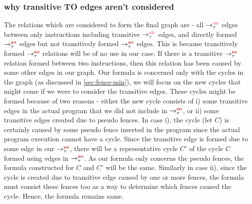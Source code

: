 \subsubsection{why transitive TO edges aren't considered} \label{sec:no-transitive}
The relations which are considered to form the final graph are - 
all $\setSB$ edges between only \mosc instructions including transitive $\setSB$ edges, 
and directly formed $\setSO$ edges but not transitively formed $\setSO$ edges.  
This is because transitively formed $\setSO$ relations will be of 
no use in our case. If there is a transitive $\setSO$ relation formed 
between two instructions, then this relation has been caused by 
some other edges in our graph. 
Our formula is concerned only with the cycles in the graph 
(as discussed in \textsection\ref{sec:fence-min}), we will focus on 
the new cycles that might come if we were to consider the transitive 
edges. These cycles might be formed because of two reasons - 
either the new cycle consists of i) some transitive edges in the 
actual program that we did not include in $\setSO$, or ii) some 
transitive edges created due to pseudo fences. In case i), the cycle 
(let $C$) is certainly caused by some pseudo fence inserted in the program 
since the actual program execution cannot have a cycle. Since the 
transitive edge is formed due to some edge in our $\setSO$, there 
will be a representative cycle $C'$ of the cycle $C$ formed using 
edges in $\setSO$. As our formula only concerns the pseudo fences, 
the formula constructed for $C$ and $C'$ will be the same. 
Similarly in case ii), since the cycle is created due to transitive 
edge caused by one or more fences, the formula must consist these 
fences too as a way to determine which fences caused the cycle. Hence,
the formula remains same. 


